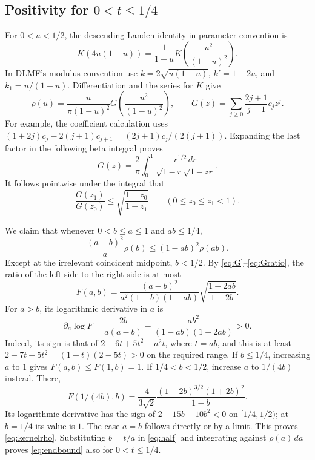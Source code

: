 \documentclass[11pt]{article}
\begin{document}
\subsection*{Positivity for $0<t\leq1/4$}
For $0<u<1/2$, the descending Landen identity \cite[19.8.11--12]{dlmf}
in parameter convention is
\[
 K(4u(1-u))=\frac1{1-u}K\left(\frac{u^2}{(1-u)^2}\right).
\]
In DLMF's modulus convention use $k=2\sqrt{u(1-u)}$,
$k'=1-2u$, and $k_1=u/(1-u)$.
Differentiation and the series for $K$ give
\begin{equation}\label{eq:G}
 \rho(u)=\frac{u}{\pi(1-u)^2}
 G\left(\frac{u^2}{(1-u)^2}\right),\qquad
 G(z)=\sum_{j\geq0}\frac{2j+1}{j+1}c_jz^j.
\end{equation}
For example, the coefficient calculation uses
$(1+2j)c_j-2(j+1)c_{j+1}=(2j+1)c_j/(2(j+1))$.
Expanding the last factor in the following beta integral proves
\[
 G(z)=\frac2\pi\int_0^1
 \frac{r^{1/2}\,dr}{\sqrt{1-r}\sqrt{1-zr}}.
\]
It follows pointwise under the integral that
\begin{equation}\label{eq:Gratio}
 \frac{G(z_1)}{G(z_0)}\leq
 \sqrt{\frac{1-z_0}{1-z_1}}\qquad(0\leq z_0\leq z_1<1).
\end{equation}

We claim that whenever $0<b\leq a\leq1$ and $ab\leq1/4$,
\begin{equation}\label{eq:kernelrho}
 \frac{(a-b)^2}{a}\rho(b)\leq(1-ab)^2\rho(ab).
\end{equation}
Except at the irrelevant coincident midpoint, $b<1/2$.
By \eqref{eq:G}--\eqref{eq:Gratio}, the ratio of the left side
to the right side is at most
\[
 F(a,b)=\frac{(a-b)^2}{a^2(1-b)(1-ab)}
          \sqrt{\frac{1-2ab}{1-2b}}.
\]
For $a>b$, its logarithmic derivative in $a$ is
\[
 \partial_a\log F=\frac{2b}{a(a-b)}
       -\frac{ab^2}{(1-ab)(1-2ab)}>0.
\]
Indeed, its sign is that of $2-6t+5t^2-a^2t$, where $t=ab$,
and this is at least
$2-7t+5t^2=(1-t)(2-5t)>0$ on the required range.
If $b\leq1/4$, increasing $a$ to $1$ gives $F(a,b)\leq F(1,b)=1$.
If $1/4<b<1/2$, increase $a$ to $1/(4b)$ instead. There,
\[
 F(1/(4b),b)=\frac4{3\sqrt2}
     \frac{(1-2b)^{3/2}(1+2b)^2}{1-b}.
\]
Its logarithmic derivative has the sign of $2-15b+10b^2<0$
on $[1/4,1/2)$; at $b=1/4$ its value is $1$.
The case $a=b$ follows directly or by a limit. This proves
\eqref{eq:kernelrho}. Substituting $b=t/a$ in \eqref{eq:half}
and integrating against $\rho(a)\,da$ proves \eqref{eq:endbound}
also for $0<t\leq1/4$.
\end{document}

